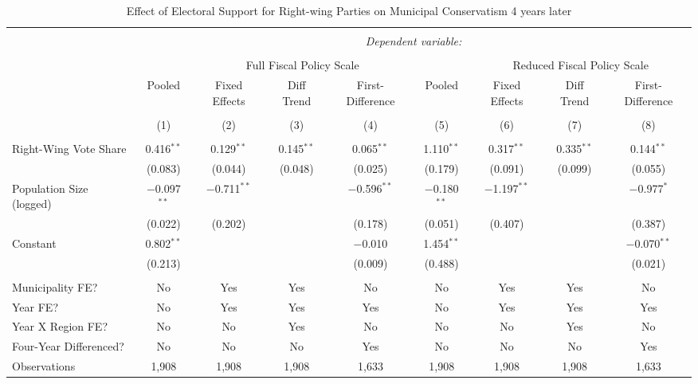 \documentclass[a4paper,12pt]{article}
\begin{document}
\begin{landscape}
	
	
	\begin{table}[!htbp] \centering 
		\caption{Effect of Electoral Support for Right-wing Parties on Municipal Conservatism 4 years later} 
		\label{tab:FourYearLead} 
		\begin{tabular}{@{\extracolsep{5pt}}lcccccccc} 
			\\[-1.8ex]\hline 
			\hline \\[-1.8ex] 
			& \multicolumn{8}{c}{\textit{Dependent variable:}} \\ 
			\cline{2-9} 
			\\[-1.8ex] & & \multicolumn{3}{c}{Full Fiscal Policy Scale} & 	&\multicolumn{3}{c}{Reduced Fiscal Policy Scale}   \\ 
			& Pooled & Fixed Effects & Diff Trend & First-Difference & Pooled & Fixed Effects & Diff Trend & First-Difference \\ 
			\\[-1.8ex] & (1) & (2) & (3) & (4) & (5) & (6) & (7) & (8)\\ 
			\hline \\[-1.8ex] 
			Right-Wing Vote Share & 0.416$^{**}$ & 0.129$^{**}$ & 0.145$^{**}$ & 0.065$^{**}$  & 1.110$^{**}$ & 0.317$^{**}$ & 0.335$^{**}$ & 0.144$^{**}$ \\ 
			& (0.083) & (0.044) & (0.048) & (0.025)  & (0.179) & (0.091) & (0.099) &  (0.055) \\ 
			Population Size (logged) & $-$0.097$^{**}$ & $-$0.711$^{**}$ &  & $-$0.596$^{**}$  & $-$0.180$^{**}$ & $-$1.197$^{**}$ &  & $-$0.977$^{*}$ \\ 
			& (0.022) & (0.202) &  & (0.178)  & (0.051) & (0.407) &  &  (0.387) \\ 
			Constant & 0.802$^{**}$ &  &  & $-$0.010 & 1.454$^{**}$ &  &  & $-$0.070$^{**}$ \\ 
			& (0.213) &  &  & (0.009) & (0.488) &  &  & (0.021) \\ 
			\hline \\[-1.8ex] 
			Municipality FE? & No & Yes & Yes & No & No & Yes & Yes & No \\ 
			Year FE? & No & Yes & Yes & Yes & No & Yes & Yes & Yes \\ 
			Year X Region FE? & No & No & Yes & No & No & No & Yes & No \\ 
			Four-Year Differenced? & No & No & No & Yes & No & No & No & Yes \\ 
			Observations & 1,908 & 1,908 & 1,908 & 1,633 & 1,908 & 1,908 & 1,908 & 1,633 \\ 

\end{tabular}
\end{table}
\end{landscape}
\end{document}
